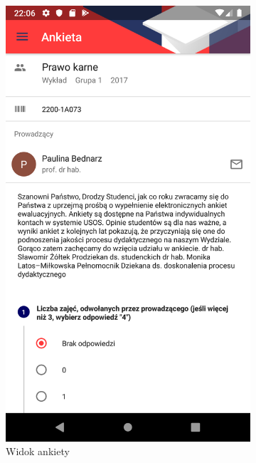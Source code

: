 \documentclass{pracamgr}
\begin{document}
\begin{figure}[p]
\begin{subfigure}[t]{0.3\textwidth}
		\includegraphics[width=\textwidth]{img/surveys_survey.png}
		\caption{Widok ankiety}
		\label{fig:surveys_survey}
	\end{subfigure}
	\quad
	\begin{subfigure}[t]{0.3\textwidth}

\end{subfigure}
\end{figure}
\end{document}
